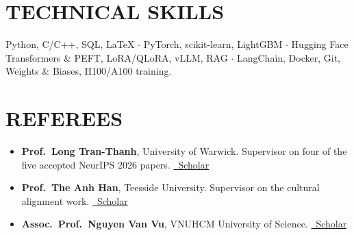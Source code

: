 \documentclass[10pt,a4paper]{article}
\begin{document}
\section*{TECHNICAL SKILLS}
{\small Python, C/C++, SQL, LaTeX $\cdot$ PyTorch, scikit-learn, LightGBM $\cdot$ Hugging Face Transformers \& PEFT, LoRA/QLoRA, vLLM, RAG $\cdot$ LangChain, Docker, Git, Weights \& Biases, H100/A100 training.}

\section*{REFEREES}
{\small
\begin{itemize}[label={},labelwidth=0pt,labelsep=0pt]
    \item \textbf{Prof.\ Long Tran-Thanh}, University of Warwick. Supervisor on four of the five accepted NeurIPS 2026 papers. \href{https://scholar.google.com.vn/citations?user=YBQai3gAAAAJ}{\faGlobe\ Scholar}
    \item \textbf{Prof.\ The Anh Han}, Teesside University. Supervisor on the cultural alignment work. \href{https://scholar.google.com/citations?user=R6zfbxgAAAAJ}{\faGlobe\ Scholar}
    \item \textbf{Assoc.\ Prof.\ Nguyen Van Vu}, VNUHCM University of Science. \href{https://scholar.google.com/citations?user=NNZVGIcAAAAJ}{\faGlobe\ Scholar}
\end{itemize}
}
\end{document}
